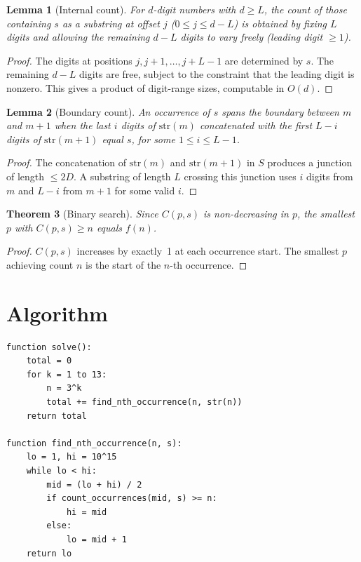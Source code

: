\documentclass[12pt]{article}
\newtheorem{theorem}{Theorem}
\newtheorem{lemma}[theorem]{Lemma}
\begin{document}
\begin{lemma}[Internal count]\label{lem:internal}
For $d$-digit numbers with $d \ge L$, the count of those containing $s$ as a substring at offset $j$ ($0 \le j \le d-L$) is obtained by fixing $L$ digits and allowing the remaining $d - L$ digits to vary freely (leading digit $\ge 1$).
\end{lemma}

\begin{proof}
The digits at positions $j, j+1, \ldots, j+L-1$ are determined by $s$. The remaining $d-L$ digits are free, subject to the constraint that the leading digit is nonzero. This gives a product of digit-range sizes, computable in $O(d)$.
\end{proof}

\begin{lemma}[Boundary count]\label{lem:boundary}
An occurrence of $s$ spans the boundary between $m$ and $m+1$ when the last $i$ digits of $\mathrm{str}(m)$ concatenated with the first $L-i$ digits of $\mathrm{str}(m+1)$ equal $s$, for some $1 \le i \le L-1$.
\end{lemma}

\begin{proof}
The concatenation of $\mathrm{str}(m)$ and $\mathrm{str}(m+1)$ in $S$ produces a junction of length $\le 2D$. A substring of length $L$ crossing this junction uses $i$ digits from $m$ and $L-i$ from $m+1$ for some valid $i$.
\end{proof}

\begin{theorem}[Binary search]\label{thm:bsearch}
Since $C(p,s)$ is non-decreasing in $p$, the smallest $p$ with $C(p,s) \ge n$ equals $f(n)$.
\end{theorem}

\begin{proof}
$C(p,s)$ increases by exactly~1 at each occurrence start. The smallest $p$ achieving count $n$ is the start of the $n$-th occurrence.
\end{proof}

\section{Algorithm}
\begin{verbatim}
function solve():
    total = 0
    for k = 1 to 13:
        n = 3^k
        total += find_nth_occurrence(n, str(n))
    return total

function find_nth_occurrence(n, s):
    lo = 1, hi = 10^15
    while lo < hi:
        mid = (lo + hi) / 2
        if count_occurrences(mid, s) >= n:
            hi = mid
        else:
            lo = mid + 1
    return lo
\end{verbatim}
\end{document}
